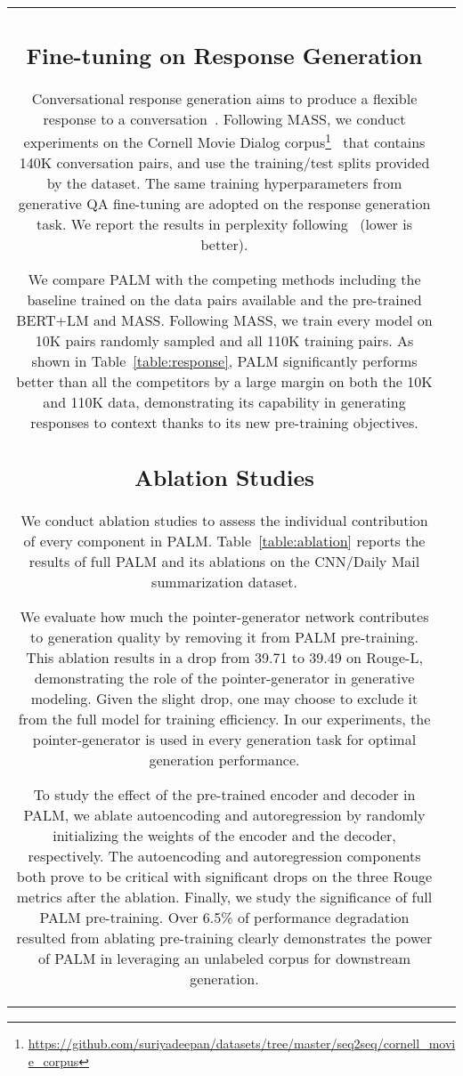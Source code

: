 \documentclass[11pt,a4paper]{article}
\newcommand{\method}{PALM\xspace}
\begin{document}
\begin{table*}[t]
\begin{tabular}{ c | l }
\subsection{Fine-tuning on Response Generation}
\vspace{-5pt}
Conversational response generation aims to produce a flexible response to a conversation~\cite{Vinyals:2015}. Following MASS, we conduct experiments on the Cornell Movie Dialog corpus\footnote{\url{https://github.com/suriyadeepan/datasets/tree/master/seq2seq/cornell_movie_corpus}}~\cite{Danescu:2011} that contains 140K conversation pairs, and use the training/test splits provided by the dataset. The same training hyperparameters from generative QA fine-tuning are adopted on the response generation task. We report the results in perplexity following~\cite{Vinyals:2015} (lower is better).

We compare \method with the competing methods including the baseline trained on the data pairs available and the pre-trained BERT+LM and MASS. Following MASS, we train every model on 10K pairs randomly sampled and all 110K training pairs. As shown in Table~\ref{table:response}, \method significantly performs better than all the competitors by a large margin on both the 10K and 110K data, demonstrating its capability in generating responses to context thanks to its new pre-training objectives.

\vspace{-5pt}
\subsection{Ablation Studies}
\vspace{-5pt}
We conduct ablation studies to assess the individual contribution of every component in \method. Table~\ref{table:ablation} reports the results of full \method and its ablations on the CNN/Daily Mail summarization dataset.

We evaluate how much the pointer-generator network contributes to generation quality by removing it from \method pre-training. This ablation results in a drop from 39.71 to 39.49 on Rouge-L, demonstrating the role of the pointer-generator in generative modeling. Given the slight drop, one may choose to exclude it from the full model for training efficiency. In our experiments, the pointer-generator is used in every generation task for optimal generation performance.

To study the effect of the pre-trained encoder and decoder in \method, we ablate autoencoding and autoregression by randomly initializing the weights of the encoder and the decoder, respectively. The autoencoding and autoregression components both prove to be critical with significant drops on the three Rouge metrics after the ablation. Finally, we study the significance of full \method pre-training. Over 6.5\% of performance degradation resulted from ablating pre-training clearly demonstrates the power of \method in leveraging an unlabeled corpus for downstream generation.


\end{tabular}
\end{table*}
\end{document}
